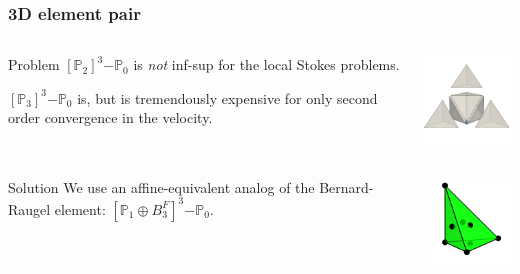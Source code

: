 \documentclass[presentation]{beamer}
\newcommand{\PtwothreePzero}{\ensuremath{[\mathbb{P}_2]^3\mathrm{-}\mathbb{P}_0}\xspace}
\newcommand{\PthreePzero}{\ensuremath{[\mathbb{P}_3]^3\mathrm{-}\mathbb{P}_0}\xspace}
\newcommand{\Pzero}{\ensuremath{\mathbb{P}_0}\xspace}
\newcommand{\PoneFB}{\ensuremath{\mathbb{P}_1 \oplus B^F_3}\xspace}
\begin{document}
\begin{frame}
  \frametitle{3D element pair}
  \begin{columns}
    \begin{column}{0.6\textwidth}
      \begin{block}{Problem}
        $\PtwothreePzero$ is \emph{not} inf-sup for the local Stokes problems.

        $\PthreePzero$ is, but is tremendously expensive for only
        second order convergence in the velocity.
      \end{block}
    \end{column}
    \begin{column}{0.38\textwidth}
      \begin{center}
        \includegraphics[width=3.5cm]{exploded_tet}
      \end{center}
    \end{column}
  \end{columns}

  \begin{columns}
    \begin{column}{0.6\textwidth}
      \begin{block}{Solution}
        We use an affine-equivalent analog of the Bernard-Raugel
        element: $[\PoneFB]^{3}\mathrm{-}\Pzero$.
      \end{block}
    \end{column}
    \begin{column}{0.38\textwidth}
      \begin{center}
        \includegraphics[width=3cm]{P1FB}
      \end{center}
    \end{column}
  \end{columns}
\end{frame}
\end{document}
